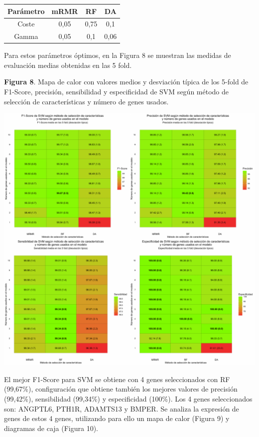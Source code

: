 \begin{table}[H]
	\centering
	\begin{tabular}{cccc}
		\hline
		\textbf{Parámetro} & \textbf{mRMR} & \textbf{RF} & \textbf{DA} \\ \hline
		Coste                &    0,05 &    0,75     &   0,1       \\
		Gamma               &     0,05    &     0,1   & 0,06        \\ \hline
	\end{tabular}
\end{table}

Para estos parámetros óptimos, en la Figura 8 se muestran las medidas de evaluación medias obtenidas en las 5 fold.\\

\newpage
\begin{center}
\textbf{Figura 8}. Mapa de calor con valores medios y desviación típica de los 5-fold de F1-Score, precisión, sensibilidad y especificidad de SVM según método de selección de características y número de genes usados.
\end{center}
\begin{center}
	\includegraphics[width=1\textwidth]{figuras/08_higado_biclase_heatmap_svm.pdf} 
\end{center}

El mejor F1-Score para SVM se obtiene con 4 genes seleccionados con RF (99,67\%), configuración que obtiene también los mejores valores de precisión (99,42\%), sensibilidad (99,34\%) y especificidad (100\%). Los 4 genes seleccionados son: ANGPTL6, PTH1R, ADAMTS13 y BMPER. Se analiza la expresión de genes de estos 4 genes, utilizando para ello un mapa de calor (Figura 9) y diagramas de caja (Figura 10).

